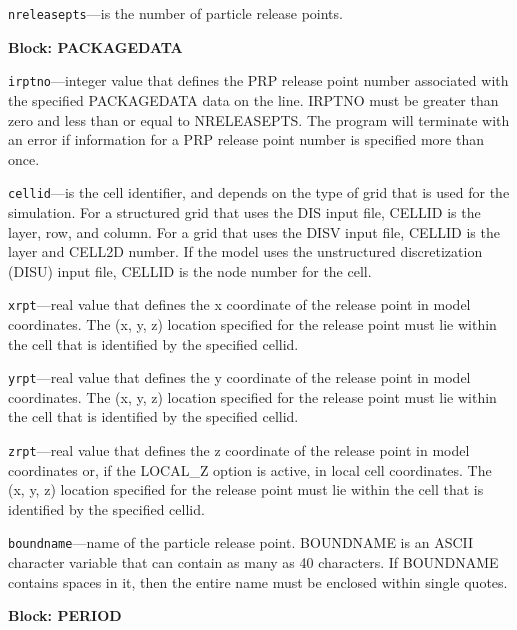 \begin{description}
\item \texttt{nreleasepts}---is the number of particle release points.

\end{description}
\item \textbf{Block: PACKAGEDATA}

\begin{description}
\item \texttt{irptno}---integer value that defines the PRP release point number associated with the specified PACKAGEDATA data on the line. IRPTNO must be greater than zero and less than or equal to NRELEASEPTS.  The program will terminate with an error if information for a PRP release point number is specified more than once.

\item \texttt{cellid}---is the cell identifier, and depends on the type of grid that is used for the simulation.  For a structured grid that uses the DIS input file, CELLID is the layer, row, and column.   For a grid that uses the DISV input file, CELLID is the layer and CELL2D number.  If the model uses the unstructured discretization (DISU) input file, CELLID is the node number for the cell.

\item \texttt{xrpt}---real value that defines the x coordinate of the release point in model coordinates.  The (x, y, z) location specified for the release point must lie within the cell that is identified by the specified cellid.

\item \texttt{yrpt}---real value that defines the y coordinate of the release point in model coordinates.  The (x, y, z) location specified for the release point must lie within the cell that is identified by the specified cellid.

\item \texttt{zrpt}---real value that defines the z coordinate of the release point in model coordinates or, if the LOCAL\_Z option is active, in local cell coordinates.  The (x, y, z) location specified for the release point must lie within the cell that is identified by the specified cellid.

\item \texttt{boundname}---name of the particle release point. BOUNDNAME is an ASCII character variable that can contain as many as 40 characters. If BOUNDNAME contains spaces in it, then the entire name must be enclosed within single quotes.

\end{description}
\item \textbf{Block: PERIOD}

